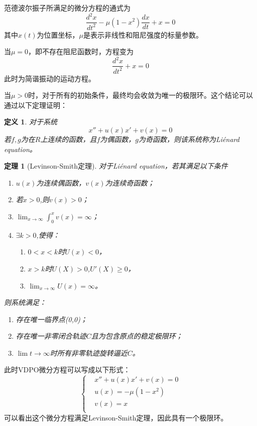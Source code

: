 \documentclass[10.5pt,oneside,a4paper]{article}
\theoremstyle{mystyle}
\newtheorem*{theorem}{定理}
\newtheorem*{definition}{定义}
\begin{document}
范德波尔振子所满足的微分方程的通式为
\begin{equation}
    \frac{d^2 x}{dt^2}-\mu(1-x^2)\frac{dx}{dt}+x=0
\end{equation}
其中$x(t)$为位置坐标，$\mu$是表示非线性和阻尼强度的标量参数。

当$\mu=0$，即不存在阻尼函数时，方程变为
\begin{equation}
    \frac{d^2 x}{dt^2}+x=0
\end{equation}
此时为简谐振动的运动方程。

当$\mu>0$时，对于所有的初始条件，最终均会收敛为唯一的极限环。这个结论可以通过以下定理证明：

\begin{definition}
    对于系统
    $$x''+u(x)x'+v(x)=0$$
    若$f,g$为在$R$上连续的函数，且$f$为偶函数，$g$为奇函数，则该系统称为Liénard equation。
\end{definition}

\begin{theorem}[Levinson-Smith定理]
    对于Liénard equation，若其满足以下条件
    \begin{enumerate}[align=left]
        \item $u(x)$为连续偶函数，$v(x)$为连续奇函数；
        \item 若$x>0$,则$v(x)>0$；
        \item $\displaystyle\lim_{x \to \infty}\int_{0}^{x}v(x)=\infty$；
        \item $ {\exists}k>0$,使得：
        \begin{enumerate}[label={}]
            \item $0<x<k$时$U(x)<0$，
            \item $x>k$时$U(X)>0$,$U'(X) \geq 0$，
            \item $\displaystyle\lim_{x \to \infty}U(x)=\infty$。
        \end{enumerate}


    \end{enumerate}
    则系统满足：
    \begin{enumerate}[label={}]
        \item 存在唯一临界点(0,0)；
        \item 存在唯一非零闭合轨迹$C$且为包含原点的稳定极限环；
        \item$\lim{t \to \infty}$时所有非零轨迹旋转逼近$C$。
    \end{enumerate}   
\end{theorem}
此时VDPO微分方程可以写成以下形式：
\begin{equation}
    \left \{
    \begin{aligned}
    &x''+u(x)x'+v(x)=0\\
    &u(x)=-\mu(1-x^2)\\
    &v(x)=x\\
    \end{aligned}
\right.
\end{equation}
可以看出这个微分方程满足Levinson-Smith定理，因此具有一个极限环。
\end{document}
